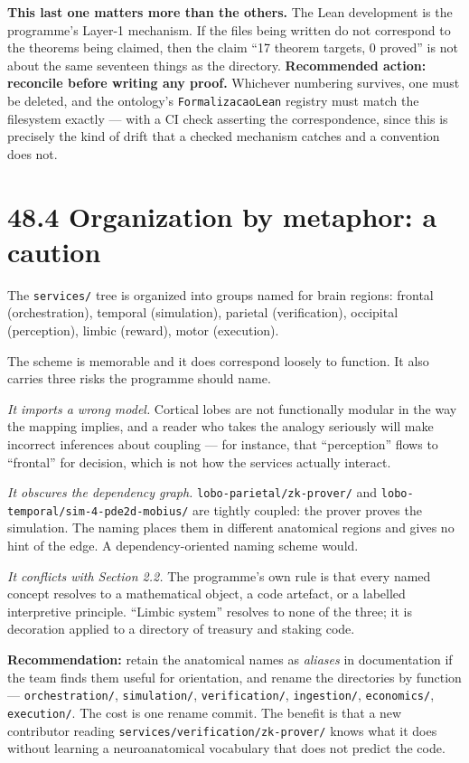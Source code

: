 \documentclass[
  11pt]{report}
\begin{document}
\textbf{This last one matters more than the others.} The Lean
development is the programme's Layer-1 mechanism. If the files being
written do not correspond to the theorems being claimed, then the claim
``17 theorem targets, 0 proved'' is not about the same seventeen things
as the directory. \textbf{Recommended action: reconcile before writing
any proof.} Whichever numbering survives, one must be deleted, and the
ontology's \texttt{FormalizacaoLean} registry must match the filesystem
exactly --- with a CI check asserting the correspondence, since this is
precisely the kind of drift that a checked mechanism catches and a
convention does not.

\hypertarget{organization-by-metaphor-a-caution}{%
\section{48.4 Organization by metaphor: a
caution}\label{organization-by-metaphor-a-caution}}

The \texttt{services/} tree is organized into groups named for brain
regions: frontal (orchestration), temporal (simulation), parietal
(verification), occipital (perception), limbic (reward), motor
(execution).

The scheme is memorable and it does correspond loosely to function. It
also carries three risks the programme should name.

\emph{It imports a wrong model.} Cortical lobes are not functionally
modular in the way the mapping implies, and a reader who takes the
analogy seriously will make incorrect inferences about coupling --- for
instance, that ``perception'' flows to ``frontal'' for decision, which
is not how the services actually interact.

\emph{It obscures the dependency graph.}
\texttt{lobo-parietal/zk-prover/} and
\texttt{lobo-temporal/sim-4-pde2d-mobius/} are tightly coupled: the
prover proves the simulation. The naming places them in different
anatomical regions and gives no hint of the edge. A dependency-oriented
naming scheme would.

\emph{It conflicts with Section 2.2.} The programme's own rule is that
every named concept resolves to a mathematical object, a code artefact,
or a labelled interpretive principle. ``Limbic system'' resolves to none
of the three; it is decoration applied to a directory of treasury and
staking code.

\textbf{Recommendation:} retain the anatomical names as \emph{aliases}
in documentation if the team finds them useful for orientation, and
rename the directories by function --- \texttt{orchestration/},
\texttt{simulation/}, \texttt{verification/}, \texttt{ingestion/},
\texttt{economics/}, \texttt{execution/}. The cost is one rename commit.
The benefit is that a new contributor reading
\texttt{services/verification/zk-prover/} knows what it does without
learning a neuroanatomical vocabulary that does not predict the code.
\end{document}
